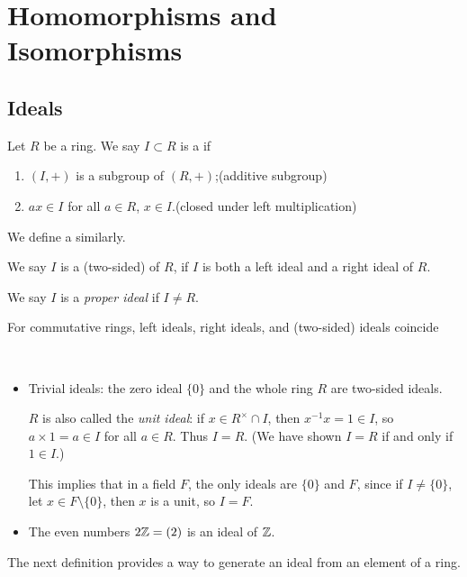 \section{Homomorphisms and Isomorphisms}
\subsection{Ideals}
\begin{definition}[Ideal]
Let $R$ be a ring. We say $I\subset R$ is a  if
\begin{enumerate}[label=(\roman*)]
\item $(I,+)$ is a subgroup of $(R,+)$;\hfill(additive subgroup)
\item $ax\in I$ for all $a\in R$, $x\in I$.\hfill(closed under left multiplication)
\end{enumerate}

We define a  similarly.

We say $I$ is a (two-sided)  of $R$, if $I$ is both a left ideal and a right ideal of $R$.
\end{definition}

We say $I$ is a \emph{proper ideal} if $I\neq R$.

\begin{remark}
For commutative rings, left ideals, right ideals, and (two-sided) ideals coincide
\end{remark}

\begin{example} \
\begin{itemize}
\item Trivial ideals: the zero ideal $\{0\}$ and the whole ring $R$ are two-sided ideals.

$R$ is also called the \emph{unit ideal}: if $x\in R^\times\cap I$, then $x^{-1}x=1\in I$, so $a\times 1=a\in I$ for all $a\in R$. Thus $I=R$. (We have shown $I=R$ if and only if $1\in I$.) 

This implies that in a field $F$, the only ideals are $\{0\}$ and $F$, since if $I\neq\{0\}$, let $x\in F\setminus\{0\}$, then $x$ is a unit, so $I=F$.

\item The even numbers $2\mathbb Z=(2)$ is an ideal of $\mathbb Z$.
\end{itemize}
\end{example}

The next definition provides a way to generate an ideal from an element of a ring.

